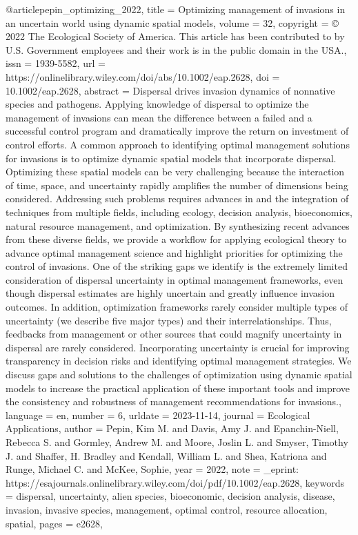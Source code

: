 {{@article{pepin_optimizing_2022,
	title = {Optimizing management of invasions in an uncertain world using dynamic spatial models},
	volume = {32},
	copyright = {© 2022 The Ecological Society of America. This article has been contributed to by U.S. Government employees and their work is in the public domain in the USA.},
	issn = {1939-5582},
	url = {https://onlinelibrary.wiley.com/doi/abs/10.1002/eap.2628},
	doi = {10.1002/eap.2628},
	abstract = {Dispersal drives invasion dynamics of nonnative species and pathogens. Applying knowledge of dispersal to optimize the management of invasions can mean the difference between a failed and a successful control program and dramatically improve the return on investment of control efforts. A common approach to identifying optimal management solutions for invasions is to optimize dynamic spatial models that incorporate dispersal. Optimizing these spatial models can be very challenging because the interaction of time, space, and uncertainty rapidly amplifies the number of dimensions being considered. Addressing such problems requires advances in and the integration of techniques from multiple fields, including ecology, decision analysis, bioeconomics, natural resource management, and optimization. By synthesizing recent advances from these diverse fields, we provide a workflow for applying ecological theory to advance optimal management science and highlight priorities for optimizing the control of invasions. One of the striking gaps we identify is the extremely limited consideration of dispersal uncertainty in optimal management frameworks, even though dispersal estimates are highly uncertain and greatly influence invasion outcomes. In addition, optimization frameworks rarely consider multiple types of uncertainty (we describe five major types) and their interrelationships. Thus, feedbacks from management or other sources that could magnify uncertainty in dispersal are rarely considered. Incorporating uncertainty is crucial for improving transparency in decision risks and identifying optimal management strategies. We discuss gaps and solutions to the challenges of optimization using dynamic spatial models to increase the practical application of these important tools and improve the consistency and robustness of management recommendations for invasions.},
	language = {en},
	number = {6},
	urldate = {2023-11-14},
	journal = {Ecological Applications},
	author = {Pepin, Kim M. and Davis, Amy J. and Epanchin-Niell, Rebecca S. and Gormley, Andrew M. and Moore, Joslin L. and Smyser, Timothy J. and Shaffer, H. Bradley and Kendall, William L. and Shea, Katriona and Runge, Michael C. and McKee, Sophie},
	year = {2022},
	note = {\_eprint: https://esajournals.onlinelibrary.wiley.com/doi/pdf/10.1002/eap.2628},
	keywords = {dispersal, uncertainty, alien species, bioeconomic, decision analysis, disease, invasion, invasive species, management, optimal control, resource allocation, spatial},
	pages = {e2628},
}

}}
